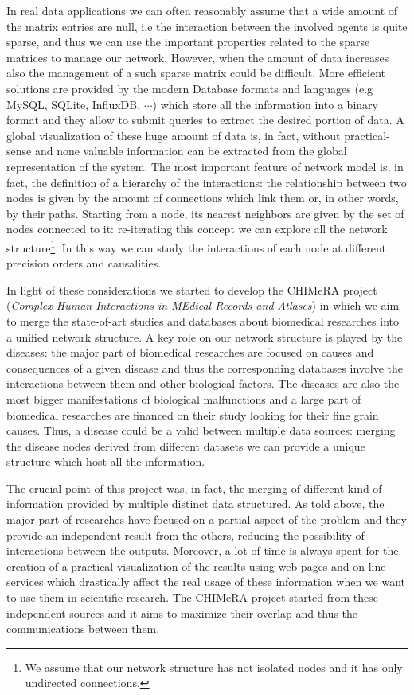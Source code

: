 \documentclass{standalone}
\begin{document}
In real data applications we can often reasonably assume that a wide amount of the matrix entries are null, i.e the interaction between the involved agents is quite sparse, and thus we can use the important properties related to the sparse matrices to manage our network.
However, when the amount of data increases also the management of a such sparse matrix could be difficult.
More efficient solutions are provided by the modern Database formats and languages (e.g \textsf{MySQL}, \textsf{SQLite}, \textsf{InfluxDB}, $\cdots$) which store all the information into a binary format and they allow to submit queries to extract the desired portion of data.
A global visualization of these huge amount of data is, in fact, without practical-sense and none valuable information can be extracted from the global representation of the system.
The most important feature of network model is, in fact, the definition of a hierarchy of the interactions: the relationship between two nodes is given by the amount of connections which link them or, in other words, by their paths.
Starting from a node, its nearest neighbors are given by the set of nodes connected to it: re-iterating this concept we can explore all the network structure\footnote{
  We assume that our network structure has not isolated nodes and it has only undirected connections.
}.
In this way we can study the interactions of each node at different precision orders and causalities.

In light of these considerations we started to develop the \textsf{CHIMeRA} project (\emph{Complex Human Interactions in MEdical Records and Atlases}) in which we aim to merge the state-of-art studies and databases about biomedical researches into a unified network structure.
A key role on our network structure is played by the diseases: the major part of biomedical researches are focused on causes and consequences of a given disease and thus the corresponding databases involve the interactions between them and other biological factors.
The diseases are also the most bigger manifestations of biological malfunctions and a large part of biomedical researches are financed on their study looking for their fine grain causes.
Thus, a disease could be a valid  between multiple data sources: merging the disease nodes derived from different datasets we can provide a unique structure which host all the information.

The crucial point of this project was, in fact, the merging of different kind of information provided by multiple distinct data structured.
As told above, the major part of researches have focused on a partial aspect of the problem and they provide an independent result from the others, reducing the possibility of interactions between the outputs.
Moreover, a lot of time is always spent for the creation of a practical visualization of the results using web pages and on-line services which drastically affect the real usage of these information when we want to use them in scientific research.
The \textsf{CHIMeRA} project started from these independent sources and it aims to maximize their overlap and thus the communications between them.
\end{document}
